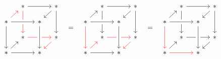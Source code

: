 \documentclass[a4paper,10pt,numbers=noenddot]{scrartcl}
\begin{document}
\[\begin{array}{cccccccc}
\begin{tikzcd}[row sep = 10, column sep = 10]
        {}
      & *
        \arrow[rr]
        \arrow[dd, red]
      & {}
      & *
        \arrow[dl]
        \arrow[dd]
      \\
        *
        \arrow[ur, red]
        \arrow[rr, crossing over]
        \arrow[dd]
      & {}
      & *
      & {}
      \\
        {}
      & *
        \arrow[rr, red]
      & {}
      & *
        \arrow[dl, red]
      \\
        *
        \arrow[ur]
        \arrow[rr]
      & {}
      & *
        \arrow[from=uu, crossing over]
      & {}
    \end{tikzcd}
    & = &
    \begin{tikzcd}[row sep = 10, column sep = 10]
        {}
      & *
        \arrow[rr]
        \arrow[dd]
      & {}
      & *
        \arrow[dl]
        \arrow[dd]
      \\
        *
        \arrow[ur]
        \arrow[rr, crossing over]
        \arrow[dd, red]
      & {}
      & *
      & {}
      \\
        {}
      & *
        \arrow[rr, red]
      & {}
      & *
        \arrow[dl, red]
      \\
        *
        \arrow[ur, red]
        \arrow[rr]
      & {}
      & *
        \arrow[from=uu, crossing over]
      & {}
    \end{tikzcd}
    & = &
    \begin{tikzcd}[row sep = 10, column sep = 10]
        {}
      & *
        \arrow[rr]
        \arrow[dd]
      & {}
      & *
        \arrow[dl]
        \arrow[dd]
      \\
        *
        \arrow[ur]
        \arrow[rr, crossing over]
        \arrow[dd, red]
      & {}
      & *
      & {}
      \\
        {}
      & *
        \arrow[rr]
      & {}
      & *
        \arrow[dl]
      \\
        *
        \arrow[ur]
        \arrow[rr, red]
      & {}
      & *
        \arrow[from=uu, crossing over]
      & {}
    \end{tikzcd}
  \end{array}
\]
\end{document}
